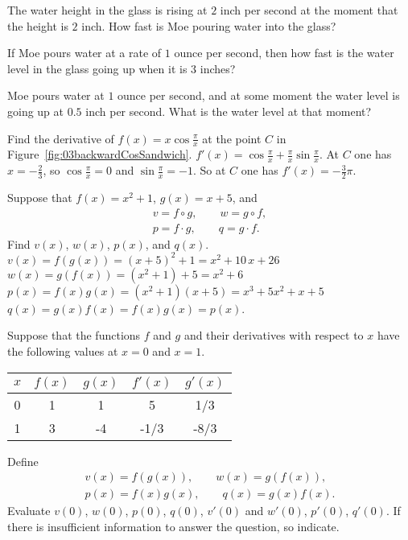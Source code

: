 \begin{multicols}{2}
\subprob  The water height in the glass is rising at $2$ inch per
second at the moment that the height is $2$ inch.  How fast is Moe
pouring water into the glass?

\subprob  If Moe pours water at a rate of $1$ ounce per second, then
how fast is the water level in the glass going up when it is $3$ inches?

\subprob  Moe pours water at $1$ ounce per second, and at some moment
the water level is going up at $0.5$ inch per second.  What is the water
level at that moment?


\problem Find the derivative of $f(x) = x\cos\frac\pi x$ at the point $C$ in
Figure~\ref{fig:03backwardCosSandwich}.
\answer
$f'(x) = \cos\frac\pi x + \frac\pi x \sin\frac\pi x$.
At $C$ one has $x=-\frac23$, so $\cos\frac\pi x = 0$ and
$\sin\frac\pi x = -1$.  So at $C$ one has $f'(x) = -\frac32\pi$.
\endanswer



\problem Suppose that $f(x)=x^2+1$, $g(x)=x+5$, and
\begin{gather*}
v = f\circ g, \qquad w=g\circ f, \\
p= f\cdot g,\qquad q=g\cdot f.
\end{gather*}
Find $v(x)$, $w(x)$, $p(x)$, and $q(x)$.
\answer
$v(x) = f(g(x)) = (x+5)^2+1 = x^2+10\,x+26$ \\
$w(x)=g(f(x)) = (x^2+1)+5 = x^2+6$\\
$p(x)= f(x)g(x) = (x^2+1)(x+5) = x^3+5x^2+x+5$\\
$q(x) = g(x)f(x) = f(x)g(x) = p(x)$.
\endanswer


\problem \groupproblem  Suppose that the functions $f$ and $g$ and
their derivatives with respect to $x$ have the following values at
$x=0$ and $x=1$.

\begin{center}
  \begin{tabular}{ccccc}
    \toprule
    $x$ & $f(x)$ & $g(x)$ & $f'(x)$ & $g'(x)$ \\ \midrule
    0   &   1    &   1    &   5   & 1/3   \\  
    1   &   3    &  -4    &  -1/3 & -8/3   \\
    \bottomrule
  \end{tabular}
\end{center}
Define
\begin{gather*}
  v(x) = f(g(x)), \qquad w(x) = g(f(x)), \\
  p(x)= f(x)g(x),\qquad q(x)=g(x)f(x).
\end{gather*}
Evaluate $v(0)$, $w(0)$, $p(0)$, $q(0)$, $v'(0)$ and $w'(0)$,
$p'(0)$, $q'(0)$.  If there is insufficient information to answer
the question, so indicate.



\end{multicols}
